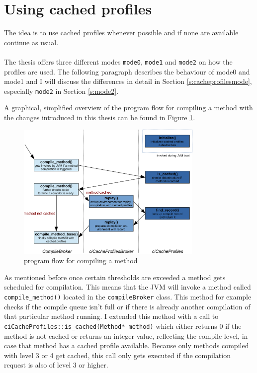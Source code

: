 \section{Using cached profiles}
\label{s:usingprofiles}
The idea is to use cached profiles whenever possible and if none are available continue as usual.
\\\\
The thesis offers three different modes \texttt{mode0}, \texttt{mode1} and \texttt{mode2} on how the profiles are used.
The following paragraph describes the behaviour of mode0 and mode1 and I will discuss the differences in detail in Section \ref{s:cacheprofilesmode}, especially \texttt{mode2} in Section \ref{s:mode2}.

A graphical, simplified overview of the program flow for compiling a method with the changes introduced in this thesis can be found in Figure \ref{f:programflow}.
\begin{figure}[h]
  \begin{center}
    \centering
    \includegraphics[width=0.8\textwidth]{figures/program_flow.png}
    \caption{program flow for compiling a method}
    \label{f:programflow}
  \end{center}
\end{figure}
As mentioned before once certain thresholds are exceeded a method gets scheduled for compilation. This means that the JVM will invoke a method called \texttt{compile\_method()} located in the \texttt{compileBroker} class. This method for example checks if the compile queue isn't full or if there is already another compilation of that particular method running.
I extended this method with a call to \texttt{ciCacheProfiles::is\_cached(Method* method)} which either returns 0 if the method is not cached or returns an integer value, reflecting the compile level, in case that method has a cached profile available. Because only methods compiled with level 3 or 4 get cached, this call only gets executed if the compilation request is also of level 3 or higher.
